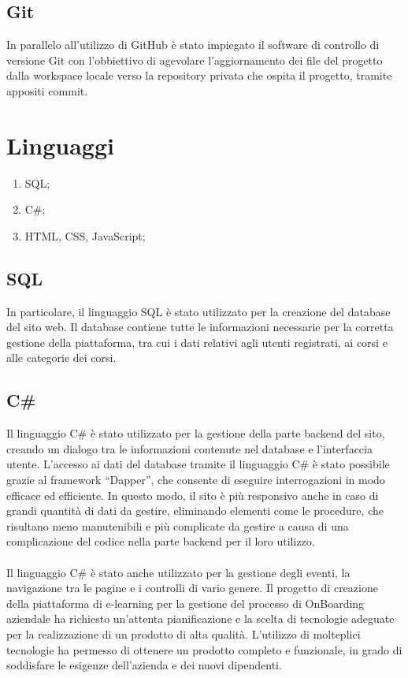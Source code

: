\subsection{Git}\label{sec:cap_sec_subsec}
In parallelo all'utilizzo di GitHub è stato impiegato il software di controllo di versione Git 
con l'obbiettivo di agevolare l'aggiornamento dei file del progetto dalla workspace locale verso 
la repository privata che ospita il progetto, tramite appositi commit.
\section{Linguaggi}\label{sec:cap_sec_subsec}
\begin{enumerate}
    \item SQL;
    \item C\#;
    \item HTML, CSS, JavaScript;
\end{enumerate}
%
\subsection{SQL}\label{sec:cap_sec_subsec}
In particolare, il linguaggio SQL è stato utilizzato per 
la creazione del database del sito web. Il database contiene tutte le informazioni 
necessarie per la corretta gestione della piattaforma, tra cui i dati relativi agli utenti 
registrati, ai corsi e alle categorie dei corsi.
%
\subsection{C\#}\label{sec:cap_sec_subsec}
Il linguaggio C\# è stato utilizzato per la gestione della parte backend del sito, 
creando un dialogo tra le informazioni contenute nel database e l'interfaccia utente. 
L'accesso ai dati del database tramite il linguaggio C\# è stato possibile grazie 
al framework ``Dapper'', che consente di eseguire interrogazioni in modo efficace ed 
efficiente. In questo modo, il sito è più responsivo anche in caso di grandi quantità di 
dati da gestire, eliminando elementi come le procedure, che risultano meno 
manutenibili e più complicate da gestire a causa di una complicazione del codice nella 
parte backend per il loro utilizzo. 
\\ \\
Il linguaggio C\# è stato anche utilizzato per la 
gestione degli eventi, la navigazione tra le pagine e i controlli di vario genere.
Il progetto di creazione della piattaforma di e-learning per la gestione del processo di 
OnBoarding aziendale ha richiesto un'attenta pianificazione e la scelta di tecnologie 
adeguate per la realizzazione di un prodotto di alta qualità. L'utilizzo di molteplici 
tecnologie ha permesso di ottenere un prodotto completo e funzionale, in grado di 
soddisfare le esigenze dell'azienda e dei nuovi dipendenti.
%
